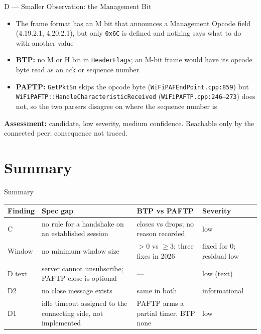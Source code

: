 \documentclass[10pt,aspectratio=169,t]{beamer}
\begin{document}
\begin{frame}{D --- Smaller Observation: the Management Bit}
\small
\begin{itemize}
  \item The frame format has an M bit that announces a Management Opcode field
        (4.19.2.1, 4.20.2.1), but only \texttt{0x6C} is defined and nothing says
        what to do with another value
  \item \textbf{BTP:} no M or H bit in \texttt{HeaderFlags}; an M-bit frame
        would have its opcode byte read as an ack or sequence number
  \item \textbf{PAFTP:} \texttt{GetPktSn} skips the opcode byte
        (\texttt{WiFiPAFEndPoint.cpp:859}) but
        \texttt{WiFiPAFTP::HandleCharacteristicReceived}
        (\texttt{WiFiPAFTP.cpp:246--273}) does not, so the two parsers disagree
        on where the sequence number is
\end{itemize}
\textbf{Assessment:} candidate, low severity, medium confidence. Reachable only
by the connected peer; consequence not traced.
\end{frame}

\section{Summary}

\begin{frame}{Summary}
\footnotesize
\begin{center}
\begin{tabular}{p{}p{}p{}p{}}
\toprule
\textbf{Finding} & \textbf{Spec gap} & \textbf{BTP vs PAFTP} & \textbf{Severity} \\
\midrule
C & no rule for a handshake on an established session & closes vs drops; no reason recorded & low \\
Window & no minimum window size & $>0$ vs $\geq 3$; three fixes in 2026 & fixed for 0; residual low \\
D text & server cannot unsubscribe; PAFTP close is optional & --- & low (text) \\
D2 & no close message exists & same in both & informational \\
D1 & idle timeout assigned to the connecting side, not implemented & PAFTP arms a partial timer, BTP none & low \\
\bottomrule
\end{tabular}
\end{center}
\end{frame}
\end{document}

